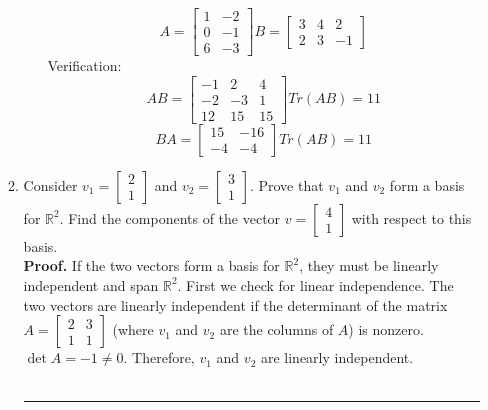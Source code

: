 \documentclass[12pt]{article}
\numberwithin{equation}{section}
\newenvironment{proof}[1][Proof]{\textbf{#1.} }{\ \rule{0.5em}{0.5em}}
\begin{document}
\begin{enumerate}
\begin{enumerate}
\begin{enumerate}
            $$A=\left[\begin{array}{cc}1&-2 \\
                                    0&-1 \\
                                     6&-3
                        \end{array}\right]  B=\left[\begin{array}{ccc}3&4&2 \\ 2&3&-1\end{array}\right]$$
                        Verification:
            $$AB=\left[\begin{array}{ccc}-1&2&4\\-2&-3&1 \\ 12& 15&15\end{array}\right]  Tr(AB)=11$$
            $$BA=\left[\begin{array}{cc}15 & -16 \\ -4&-4\end{array}\right]  Tr(AB)=11$$
        \end{enumerate}
        \item Consider $v_1=\left[\begin{array}{c} 2\\1\end{array}\right]$ and $v_2=\left[\begin{array}{c} 3\\1\end{array}\right]$. Prove that $v_1$ and $v_2$ form a basis for $\mathbb{R}^2$. Find the components of the vector $v=\left[\begin{array}{c} 4\\1\end{array}\right]$ with respect to this basis.\\
            \begin{proof}
            If the two vectors form a basis for $\mathbb{R}^2$, they must be linearly independent and span $\mathbb{R}^2$. First we check for linear independence. The two vectors are linearly independent if the determinant of the matrix $A=\left[\begin{array}{cc}2&3\\1&1\end{array}\right]$ (where $v_1$ and $v_2$ are the columns of $A$) is nonzero. $\det{A}=-1\neq 0$. Therefore, $v_1$ and $v_2$ are linearly independent.\\


\end{proof}
\end{enumerate}
\end{enumerate}
\end{document}
